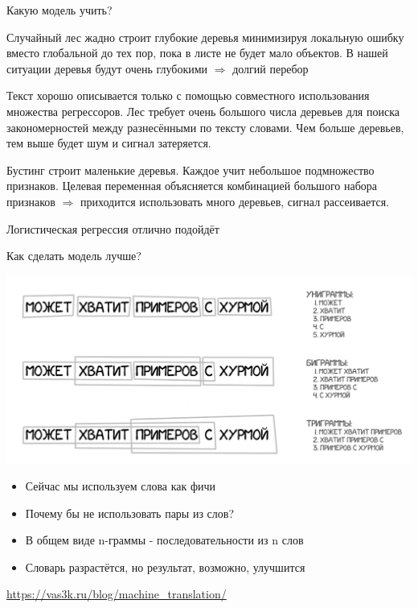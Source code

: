 \documentclass[notes,12pt, aspectratio=169]{beamer}
\newenvironment{wideitemize}{\itemize\addtolength{\itemsep}{10pt}}{\enditemize}
\begin{document}
\begin{frame}[shrink=10]{Какую модель учить?}
	
	\begin{wideitemize} 
		\item  Случайный лес жадно строит глубокие деревья минимизируя локальную ошибку вместо глобальной до тех пор, пока в листе не будет мало объектов. В нашей ситуации деревья будут очень глубокими $\Rightarrow$ \alert{долгий перебор}
		
		\item Текст хорошо описывается только с помощью совместного использования множества регрессоров. Лес требует очень большого числа деревьев для поиска закономерностей между разнесёнными по тексту словами. \alert{Чем больше деревьев, тем выше будет шум и сигнал затеряется.}
		
		\item Бустинг строит маленькие деревья. Каждое учит небольшое подмножество признаков. Целевая переменная объясняется комбинацией большого набора признаков  $\Rightarrow$ \alert{приходится использовать много деревьев, сигнал рассеивается.}
		
		\item  \alert{Логистическая регрессия отлично  подойдёт}
	\end{wideitemize}
\end{frame} 


\begin{frame}{Как сделать модель лучше?}
	\begin{center}
		\includegraphics[width=.6\linewidth]{hurma.png}
	\end{center}
	\begin{itemize} 
		\item  Сейчас мы используем слова как фичи
		\item Почему бы не использовать пары из слов? 
		\item В общем виде n-граммы - последовательности из n слов
		\item Словарь разрастётся, но результат, возможно, улучшится
	\end{itemize}
\vfill
\footnotesize  {\color{blue} \url{https://vas3k.ru/blog/machine_translation/}}
\end{frame} 
\end{document}
